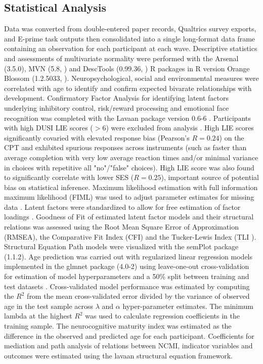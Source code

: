 \documentclass[utf8]{frontiersSCNS} %
\begin{document}
\subsection{Statistical Analysis} Data was converted from double-entered paper records, Qualtrics survey exports, and E-prime task outputs then consolidated into a single long-format data frame containing an observation for each participant at each wave. Descriptive statistics and assessments of multivariate normality were performed with the Arsenal (3.5.0), MVN (5.8, \cite{MVN}) and DescTools (0.99.36, \cite{DescTools}) R packages in R version Orange Blossom (1.2.5033, \cite{R}). Neuropsychological, social and environmental measures were correlated with age to identify and confirm expected bivarate relationships with development. Confirmatory Factor Analysis for identifying latent factors underlying inhibitory control, risk/reward processing and emotional face recognition was completed with the Lavaan package version 0.6-6 \citep{Lavaan}. Participants with high DUSI LIE scores ($>6$) were excluded from analysis \cite{dalla2003effects}. High LIE scores significantly covaried with elevated response bias (Pearson's $R=0.24$) on the CPT and exhibited spurious responses across instruments (such as faster than average completion with very low average reaction times and/or minimal variance in choices with repetitive all "no"/"false" choices). High LIE score was also found to significantly correlate with lower SES ($R=0.25$), important source of potential bias on statistical inference.  Maximum likelihood estimation with full information maximum likelihood (FIML) was used to adjust parameter estimates for missing data \citep{cham2017full}. Latent factors were standardized to allow for free estimation of factor loadings \citep{HuTzeBentler1998}. Goodness of Fit of estimated latent factor models and their structural relations was assessed using the Root Mean Square Error of Approximation (RMSEA), the Comparative Fit Index (CFI) and the Tucker-Lewis Index (TLI \cite{KennyEtAl2015,HuTzeBentler1999}). Structural Equation Path models were visualized with the semPlot package (1.1.2). Age prediction was carried out with regularized linear regression models implemented in the glmnet package (4.0-2) using leave-one-out cross-validation for estimation of model hyperparameters and a 50\% split between training and test datasets \citep{FriedmanHastieTibshirani2010, friedman2009glmnet}. Cross-validated model performance was estimated by computing the $R^2$ from the mean cross-validated error divided by the variance of observed age in the test sample across $\lambda$ and $\alpha$ hyper-parameter estimates. The minimum lambda at the highest $R^2$ was used to calculate regression coefficients in the training sample. The neurocognitive maturity index was estimated as the difference in the observed and predicted age for each participant. Coefficients for mediation and path analysis of relations between NCMI, indicator variables and outcomes were estimated using the lavaan structural equation framework.
\end{document}
